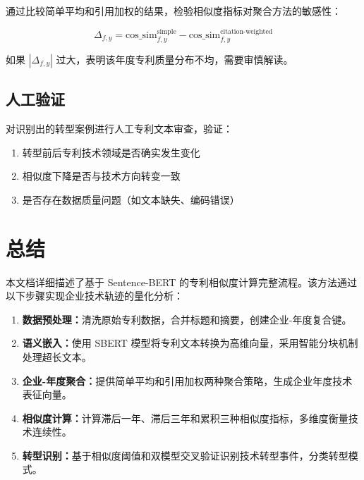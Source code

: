 \documentclass[12pt,a4paper]{article}
\theoremstyle{definition}
\begin{document}
通过比较简单平均和引用加权的结果，检验相似度指标对聚合方法的敏感性：

\begin{equation}
    \Delta_{f,y} = \text{cos\_sim}_{f,y}^{\text{simple}} - \text{cos\_sim}_{f,y}^{\text{citation-weighted}}
\end{equation}

如果 $|\Delta_{f,y}|$ 过大，表明该年度专利质量分布不均，需要审慎解读。

\subsection{人工验证}

对识别出的转型案例进行人工专利文本审查，验证：
\begin{enumerate}
    \item 转型前后专利技术领域是否确实发生变化
    \item 相似度下降是否与技术方向转变一致
    \item 是否存在数据质量问题（如文本缺失、编码错误）
\end{enumerate}

\section{总结}

本文档详细描述了基于 Sentence-BERT 的专利相似度计算完整流程。该方法通过以下步骤实现企业技术轨迹的量化分析：

\begin{enumerate}
    \item \textbf{数据预处理：}清洗原始专利数据，合并标题和摘要，创建企业-年度复合键。
    
    \item \textbf{语义嵌入：}使用 SBERT 模型将专利文本转换为高维向量，采用智能分块机制处理超长文本。
    
    \item \textbf{企业-年度聚合：}提供简单平均和引用加权两种聚合策略，生成企业年度技术表征向量。
    
    \item \textbf{相似度计算：}计算滞后一年、滞后三年和累积三种相似度指标，多维度衡量技术连续性。
    
    \item \textbf{转型识别：}基于相似度阈值和双模型交叉验证识别技术转型事件，分类转型模式。
\end{enumerate}
\end{document}
